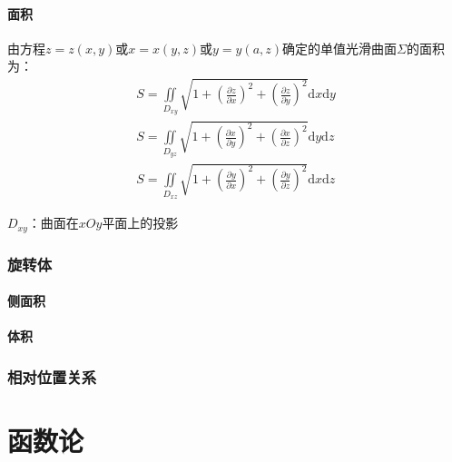 \documentclass[12pt]{book}
\begin{document}
\subsubsection{面积}



由方程$z=z(x,y)$或$x=x(y,z)$或$y=y(a,z)$确定的单值光滑曲面$\Sigma$的面积为：
\begin{gather*}
    S = \iint\limits_{D_{xy}}{ \sqrt{1+\left(\frac{\partial z}{\partial x}\right)^2+\left(\frac{\partial z}{\partial y}\right)^2} \mathrm{d}x\mathrm{d}y} \\
    S = \iint\limits_{D_{yz}}{ \sqrt{1+\left(\frac{\partial x}{\partial y}\right)^2+\left(\frac{\partial x}{\partial z}\right)^2} \mathrm{d}y\mathrm{d}z}\\
    S = \iint\limits_{D_{xz}}{ \sqrt{1+\left(\frac{\partial y}{\partial x}\right)^2+\left(\frac{\partial y}{\partial z}\right)^2} \mathrm{d}x\mathrm{d}z}
\end{gather*}
\par $D_{xy}$：曲面在$xOy$平面上的投影














\subsection{旋转体}



\subsubsection{侧面积}



\subsubsection{体积}



\subsection{相对位置关系}



\chapter{函数论}
\end{document}
